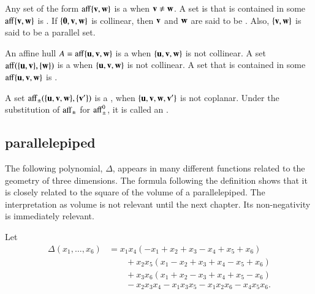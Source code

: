 	
\begin{definition}
  Any set of the form ${\operatorname{aff}}\{{\mathbf v},{\mathbf w}\}$ is a  when
  ${\mathbf v}\ne {\mathbf w}$.  A set is that is contained in some $\operatorname{aff}\{{\mathbf v},{\mathbf w}\}$ is
  .  If $\{{\mathbf 0},{\mathbf v},{\mathbf w}\}$ is collinear, then
  ${\mathbf v}$ and ${\mathbf w}$ are said to be . Also, $\{{\mathbf v},{\mathbf w}\}$
  is said to be a parallel set.
\end{definition}
%
%

\begin{definition}\label{def:plane}	
  An affine hull $A={\operatorname{aff}}\{{\mathbf u},{\mathbf v},{\mathbf w}\}$ is a  when
  $\{{\mathbf u},{\mathbf v},{\mathbf w}\}$ is not collinear.  A set ${\operatorname{aff}}(\{{\mathbf u},{\mathbf v}\},\{{\mathbf w}\})$
  is a  when $\{{\mathbf u},{\mathbf v},{\mathbf w}\}$ is not collinear. A
  set that is contained in some $\operatorname{aff}\{{\mathbf u},{\mathbf v},{\mathbf w}\}$ is .
\end{definition}
%
%
%
%


\begin{definition} 
A set
  ${\operatorname{aff}}_{\pm}(\{{\mathbf u},{\mathbf v},{\mathbf w}\},\{{\mathbf v}'\})$ is a ,
  when $\{{\mathbf u},{\mathbf v},{\mathbf w},{\mathbf v}'\}$ is not coplanar.  Under the substitution of
  ${\operatorname{aff}}_{\pm}$ for ${\operatorname{aff}}_{\pm}^0$, it is called an
  .
\end{definition}
%
%

\subsection{parallelepiped}\label{sec:piped}
%



The following polynomial, $\Delta$, appears in many different
functions related to the geometry of three dimensions.  The formula
following the definition shows that it is closely related to the
square of the volume of a parallelepiped.  The interpretation as
volume is not relevant until the next chapter.  Its non-negativity is
immediately relevant.  %

\begin{definition}[$\Delta$]\label{def:delta}
  Let
\begin{displaymath}
\begin{array}{lll}
\Delta(x_1,\ldots,x_6) &= x_1 x_4 (- x_1+x_2+x_3- x_4+x_5+x_6)\\
&\qquad+x_2 x_5 (x_1- x_2+x_3+x_4- x_5+x_6)\\
&\qquad+x_3 x_6 (x_1+x_2- x_3+x_4+x_5- x_6)\\
&\qquad- x_2 x_3 x_4- x_1 x_3 x_5- x_1 x_2 x_6- x_4 x_5 x_6.
\end{array}
\end{displaymath}
\end{definition}
%
%

